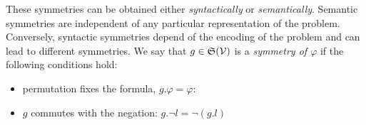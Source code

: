 %
%
%
These symmetries can be obtained either \textit{syntactically} or \textit{semantically}.
Semantic symmetries are independent of any particular representation of the problem. Conversely,
syntactic symmetries depend of the encoding of the problem and can lead to different symmetries.
 We say that $g\in \mathfrak{S}(\mathcal{V})$ is a \textit{symmetry of $ \varphi$} if the following conditions hold:
\begin{itemize}[topsep=0em]
 \item permutation fixes the formula, $g.\varphi =  \varphi$: 
 \item $g$  commutes with the negation: $g.\neg l  = \neg (g.l)$
\end{itemize}
